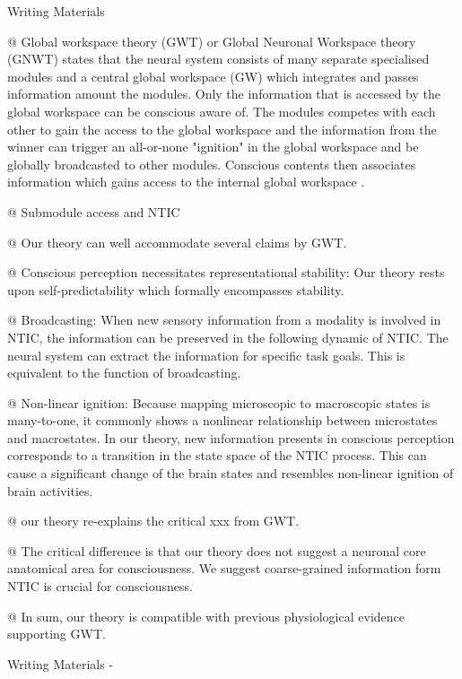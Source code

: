 \documentclass[utf8]{article}
\newenvironment{WritingMaterials} %
    	{
            \begin{tcolorbox}[enhanced,
                title=-,
                size=small,
                colbacktitle=Aquamarine,
                drop fuzzy shadow,
                fontupper=\small,
                boxrule=0.4pt,
                colback=Aquamarine!10!white,
                sharp corners]
                Writing Materials
            \end{tcolorbox}
            \begin{easylist}[itemize]
    	}
    	{
            \end{easylist}  
            \begin{tcolorbox}[enhanced,
                halign=flush right,
                halign title=right,
                size=small,
                colbacktitle=Aquamarine,
                drop fuzzy shadow,
                fontupper=\small,
                boxrule=0.4pt,
                colback=Aquamarine,
                colupper=White,
                sharp corners]
                Writing Materials -
            \end{tcolorbox}        
    	}
\begin{document}
		\begin{WritingMaterials}
			@ Global workspace theory (GWT)\cite{baars1988cognitive, baars1997theatre, baars2002conscious} or Global Neuronal Workspace theory (GNWT)\cite{dehaene1998neuronal, dehaene2001towards, dehaene2011experimental} states that the neural system consists of many separate specialised modules and a central global workspace (GW) which integrates and passes information amount the modules. Only the information that is accessed by the global workspace can be conscious aware of. The modules competes with each other to gain the access to the global workspace and the information from the winner can trigger an all-or-none "ignition" in the global workspace and be globally broadcasted to other modules. Conscious contents then associates information which gains access to the internal global workspace \cite{Dehaene2017}.
			
			@ Submodule access and NTIC

			
			@ Our theory can well accommodate several claims by GWT.
			
			@ Conscious perception necessitates representational stability: Our theory rests upon self-predictability which formally encompasses stability.
			
			@ Broadcasting: When new sensory information from a modality is involved in NTIC, the information can be preserved in the following dynamic of NTIC. The neural system can extract the information for specific task goals. This is equivalent to the function of broadcasting. 
			
			@ Non-linear ignition: Because mapping microscopic to macroscopic states is many-to-one, it commonly shows a nonlinear relationship between microstates and macrostates. In our theory, new information presents in conscious perception corresponds to a transition in the state space of the NTIC process. This can cause a significant change of the brain states and resembles non-linear ignition of brain activities.
			
			@ our theory re-explains the critical xxx from GWT. 
			
			@ The critical difference is that our theory does not suggest a neuronal core anatomical area for consciousness. We suggest coarse-grained information form NTIC is crucial for consciousness. 
			
			@ In sum, our theory is compatible with previous physiological evidence supporting GWT.  



		\end{WritingMaterials}
\end{document}
